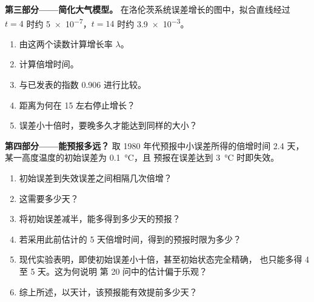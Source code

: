 \begin{problem}
\medskip\noindent\textbf{第三部分——简化大气模型。}
在洛伦茨系统误差增长的图中，拟合直线经过
$t = 4$ 时约 \num{5e-7}，$t = 14$ 时约 \num{3.9e-3}。
\begin{enumerate}[resume]
  \item 由这两个读数计算增长率 $\lambda$。
  \item 计算倍增时间。
  \item 与已发表的指数 0.906 进行比较。
  \item 距离为何在 15 左右停止增长？
  \item 误差小十倍时，要晚多久才能达到同样的大小？
\end{enumerate}

\medskip\noindent\textbf{第四部分——能预报多远？}
取 1980 年代预报中小误差所得的倍增时间 2.4 天，
某一高度温度的初始误差为 \qty{0.1}{\celsius}，且
预报在误差达到 \qty{3}{\celsius} 时即失效。
\begin{enumerate}[resume]
  \item 初始误差到失效误差之间相隔几次倍增？
  \item 这需要多少天？
  \item 将初始误差减半，能多得到多少天的预报？
  \item 若采用此前估计的 5 天倍增时间，得到的预报时限为多少？
  \item 现代实验表明，即使初始误差小十倍，甚至初始状态完全精确，
        也只能多得 4 至 5 天。这为何说明
        第 20 问中的估计偏于乐观？
  \item 综上所述，以天计，该预报能有效提前多少天？
\end{enumerate}
\end{problem}
